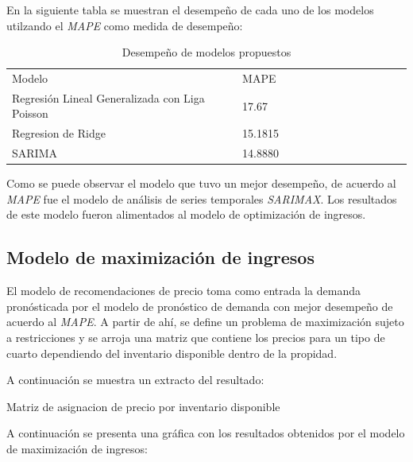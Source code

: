 En la siguiente tabla se muestran el desempeño de cada uno de los modelos utilzando el \emph{MAPE} como medida de desempeño:

\begin{table}[H]
\begin{tabular}{lllllllllllll}
Modelo  & MAPE      \\
Regresión Lineal Generalizada con Liga Poisson & 17.67 \\
Regresion de Ridge & 15.1815 \\
SARIMA & 14.8880
\end{tabular}
\caption{Desempeño de modelos propuestos} 
\end{table}

Como se puede observar el modelo que tuvo un mejor desempeño, de acuerdo al \emph{MAPE} fue el modelo de análisis de series temporales \emph{SARIMAX}. Los resultados de este modelo fueron alimentados al modelo de optimización de ingresos.

\subsection*{Modelo de maximización de ingresos}

El modelo de recomendaciones de precio toma como entrada la demanda pronósticada por el modelo de pronóstico de demanda con mejor desempeño de acuerdo al \emph{MAPE}. A partir de ahí, se define un problema de maximización sujeto a restricciones y se arroja una matriz que contiene los precios para un tipo de cuarto dependiendo del inventario disponible dentro de la propidad.

A continuación se muestra un extracto del resultado:

\begin{table}[H]
  \centering
  \par
  \caption{Matriz de asignacion de precio por inventario disponible}
\end{table}

A continuación se presenta una gráfica con los resultados obtenidos por el modelo de maximización de ingresos:

